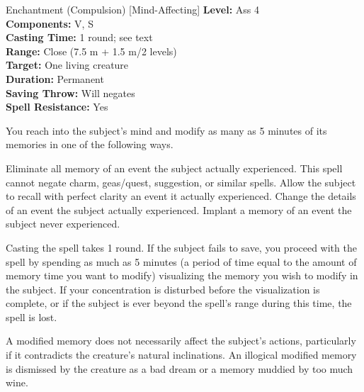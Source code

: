 {Enchantment (Compulsion) [Mind-Affecting]}
{
	\textbf{Level:}
	Ass 4\\
	\textbf{Components:}
	V, S\\
	\textbf{Casting Time:}
	1 round; see text\\
	\textbf{Range:}
	Close (7.5 m + 1.5 m/2 levels)\\
	\textbf{Target:}
	One living creature\\
	\textbf{Duration:}
	Permanent\\
	\textbf{Saving Throw:}
	Will negates\\
	\textbf{Spell Resistance:}
	Yes\\
}
{
	You reach into the subject's mind and modify as many as 5 minutes of its memories in one of the following ways.


Eliminate all memory of an event the subject actually experienced. This spell cannot negate charm, geas/quest, suggestion, or similar spells.
Allow the subject to recall with perfect clarity an event it actually experienced.
Change the details of an event the subject actually experienced.
Implant a memory of an event the subject never experienced.

	Casting the spell takes 1 round. If the subject fails to save, you proceed with the spell by spending as much as 5 minutes (a period of time equal to the amount of memory time you want to modify) visualizing the memory you wish to modify in the subject. If your concentration is disturbed before the visualization is complete, or if the subject is ever beyond the spell's range during this time, the spell is lost.

	A modified memory does not necessarily affect the subject's actions, particularly if it contradicts the creature's natural inclinations. An illogical modified memory is dismissed by the creature as a bad dream or a memory muddied by too much wine.

}
